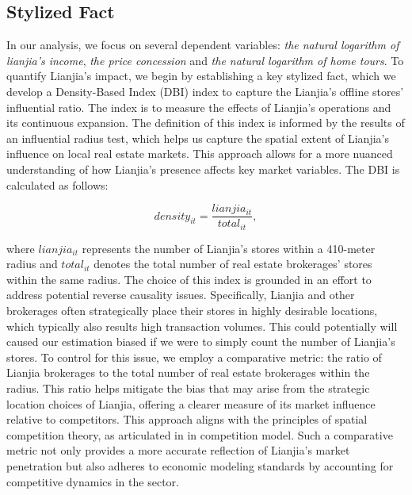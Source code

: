 \documentclass[12pt]{article}
\begin{document}
\subsection{Stylized Fact} \label{subsec:stylized_fact}

In our analysis, we focus on several dependent variables: \emph{the natural logarithm of lianjia's income}, \emph{the price concession} and \emph{the natural logarithm of home tours}. To quantify Lianjia's impact, we begin by establishing a key stylized fact, which we develop a Density-Based Index (DBI) index to capture the Lianjia's offline stores' influential ratio. The index is to measure the effects of Lianjia's operations and its continuous expansion. The definition of this index is informed by the results of an influential radius test, which helps us capture the spatial extent of Lianjia's influence on local real estate markets. This approach allows for a more nuanced understanding of how Lianjia's presence affects key market variables. The DBI is calculated as follows:

\begin{equation*}
  density_{it} = \frac{lianjia_{it}}{total_{it}},
\end{equation*}

where $lianjia_{it}$ represents the number of Lianjia's stores within a 410-meter radius and $total_{it}$ denotes the total number of real estate brokerages' stores within the same radius. The choice of this index is grounded in an effort to address potential reverse causality issues. Specifically, Lianjia and other brokerages often strategically place their stores in highly desirable locations, which typically also results high transaction volumes. This could potentially will caused our estimation biased if we were to simply count the number of Lianjia's stores. To control for this issue, we employ a comparative metric: the ratio of Lianjia brokerages to the total number of real estate brokerages within the radius. This ratio helps mitigate the bias that may arise from the strategic location choices of Lianjia, offering a clearer measure of its market influence relative to competitors. This approach aligns with the principles of spatial competition theory, as articulated in \citep{hotelling_stability_1929, daspremont_hotellings_1979} in competition model. Such a comparative metric not only provides a more accurate reflection of Lianjia's market penetration but also adheres to economic modeling standards by accounting for competitive dynamics in the sector.
\end{document}
